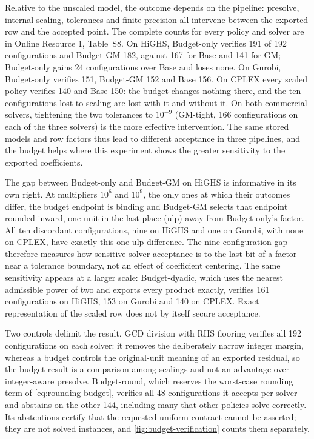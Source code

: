 \documentclass[smallextended,envcountsect,envcountsame]{svjour3}
\begin{document}
Relative to the unscaled model, the outcome depends on the pipeline: presolve, internal
scaling, tolerances and finite precision all intervene between the exported row and the
accepted point. The complete
counts for every policy and solver are in Online Resource 1, Table~S8. On HiGHS, Budget-only
verifies 191 of 192 configurations and Budget-GM 182, against 167 for Base and 141 for GM;
Budget-only gains 24 configurations over Base and loses none. On Gurobi, Budget-only verifies
151, Budget-GM 152 and Base 156. On CPLEX every scaled policy verifies 140 and Base 150: the
budget changes nothing there, and the ten configurations lost to scaling are lost with it and
without it. On both commercial solvers, tightening the two tolerances to $10^{-9}$ (GM-tight,
166 configurations on each of the three solvers) is the more effective intervention. The same
stored models and row factors thus lead to different acceptance in three pipelines, and the
budget helps where this experiment shows the greater sensitivity to the exported coefficients.

The gap between Budget-only and Budget-GM on HiGHS is informative in its own right. At
multipliers $10^6$ and $10^9$, the only ones at which their outcomes differ, the budget endpoint
is binding and Budget-GM selects that endpoint rounded inward, one unit in the last place (ulp)
away from Budget-only's factor. All ten discordant configurations, nine on HiGHS and one on Gurobi,
with none on CPLEX, have exactly this one-ulp difference. The nine-configuration gap therefore measures how
sensitive solver acceptance is to the last bit of a factor near a tolerance boundary, not an
effect of coefficient centering. The same sensitivity appears at a larger scale: Budget-dyadic,
which uses the nearest admissible power of two and exports every product exactly, verifies 161
configurations on HiGHS, 153 on Gurobi and 140 on CPLEX. Exact representation of the scaled row does not by
itself secure acceptance.

Two controls delimit the result. GCD division with RHS flooring verifies all 192 configurations
on each solver: it removes the deliberately narrow integer margin, whereas a budget controls
the original-unit meaning of an exported residual, so the budget result is a comparison among
scalings and not an advantage over integer-aware presolve. Budget-round, which reserves the
worst-case rounding term of \eqref{eq:rounding-budget}, verifies all 48 configurations it
accepts per solver and abstains on the other 144, including many that other policies solve
correctly. Its abstentions certify that the requested uniform contract cannot be asserted; they
are not solved instances, and \cref{fig:budget-verification} counts them separately.
\end{document}

